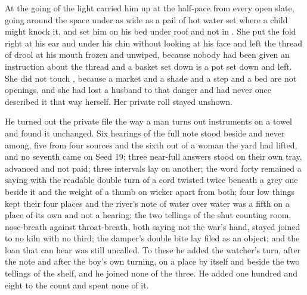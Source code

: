 \scenebreak

At the going of the light  carried him up  at the half-pace from every open slate, going around the space under  as wide as a pail of hot water set where a child might knock it, and set him on his bed under  roof and not in . She put the fold right at his ear and under his chin without looking at his face and left the thread of drool at his mouth frozen and unwiped, because nobody had been given an instruction about the thread and a basket set down is a pot set down and left. She did not touch , because a market and a shade and a step and a bed are not openings, and she had lost a husband to that danger and had never once described it that way herself. Her private roll stayed unshown.

He turned out the private file the way a man turns out instruments on a towel and found it unchanged. Six hearings of the full note stood beside and never among, five from four sources and the sixth out of a woman the yard had lifted, and no seventh came on Seed 19; three near-full answers stood on their own tray, advanced and not paid; three intervals lay on another; the word forty remained a saying with the readable double turn of a cord twisted twice beneath a grey one beside it and the weight of a thumb on wicker apart from both; four low things kept their four places and the river's note of water over water was a fifth on a place of its own and not a hearing; the two tellings of the shut counting room, nose-breath against throat-breath, both saying not the war's hand, stayed joined to no kiln with no third; the damper's double bite lay filed as an object; and the loan that can hear was still uncalled. To these he added the watcher's turn, after the note and after the boy's own turning, on a place by itself and beside the two tellings of the shelf, and he joined none of the three. He added one hundred and eight to the count and spent none of it.

